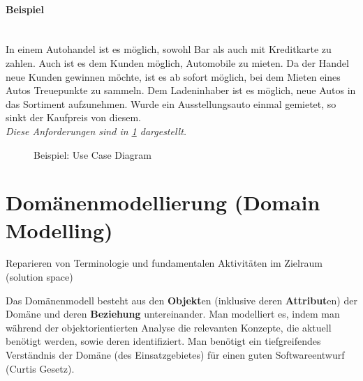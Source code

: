 \documentclass[ngerman]{tuda_summary}
\begin{document}
\paragraph{Beispiel}\mbox{}\\
In einem Autohandel ist es möglich, sowohl Bar als auch mit Kreditkarte zu zahlen. Auch ist es dem Kunden möglich, Automobile zu mieten. Da der Handel neue Kunden gewinnen möchte, ist es ab sofort möglich, bei dem Mieten eines Autos Treuepunkte zu sammeln. Dem Ladeninhaber ist es möglich, neue Autos in das Sortiment aufzunehmen. Wurde ein Ausstellungsauto einmal gemietet, so sinkt der Kaufpreis von diesem. \\ \textit{Diese Anforderungen sind in \figurename{} \ref{fig:usecase} dargestellt.}
\begin{figure}[ht]
    \centering
    \caption{Beispiel: Use Case Diagram}
    \label{fig:usecase}
\end{figure}

\FloatBarrier{}
\section{Domänenmodellierung (Domain Modelling)}
\begin{definition}
    Reparieren von Terminologie und fundamentalen Aktivitäten im Zielraum (solution space)
\end{definition}
\begin{definition}
    Das Domänenmodell besteht aus den \textbf{Objekt}en (inklusive deren \textbf{Attribut}en) der Domäne und deren  \textbf{Beziehung}  untereinander.
    Man modelliert es, indem man während der objektorientierten Analyse die relevanten Konzepte, die aktuell benötigt werden, sowie deren identifiziert. Man benötigt ein tiefgreifendes Verständnis der Domäne (des Einsatzgebietes) für einen guten Softwareentwurf (Curtis Gesetz).
\end{definition}
\end{document}

